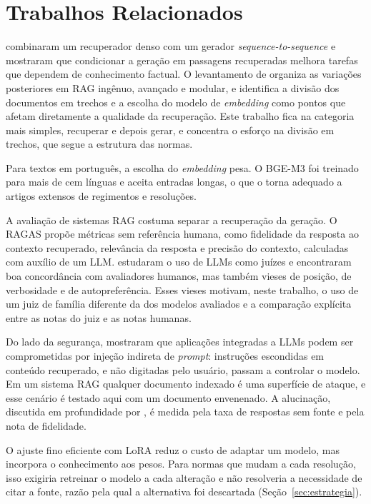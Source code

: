 \chapter{Trabalhos Relacionados}
\label{cap:trabalhos-relacionados}

 combinaram um recuperador denso com um gerador
\textit{sequence-to-sequence} e mostraram que condicionar a geração em passagens
recuperadas melhora tarefas que dependem de conhecimento factual. O levantamento de
 organiza as variações posteriores em RAG ingênuo, avançado e
modular, e identifica a divisão dos documentos em trechos e a escolha do modelo de
\textit{embedding} como pontos que afetam diretamente a qualidade da recuperação. Este
trabalho fica na categoria mais simples, recuperar e depois gerar, e concentra o
esforço na divisão em trechos, que segue a estrutura das normas.

Para textos em português, a escolha do \textit{embedding} pesa. O BGE-M3
\cite{Chen2024} foi treinado para mais de cem línguas e aceita entradas longas, o que o
torna adequado a artigos extensos de regimentos e resoluções.

A avaliação de sistemas RAG costuma separar a recuperação da geração. O RAGAS
\cite{Es2023} propõe métricas sem referência humana, como fidelidade da resposta ao
contexto recuperado, relevância da resposta e precisão do contexto, calculadas com
auxílio de um LLM.  estudaram o uso de LLMs como juízes e
encontraram boa concordância com avaliadores humanos, mas também vieses de posição, de
verbosidade e de autopreferência. Esses vieses motivam, neste trabalho, o uso de um
juiz de família diferente da dos modelos avaliados e a comparação explícita entre as
notas do juiz e as notas humanas.

Do lado da segurança,  mostraram que aplicações integradas a
LLMs podem ser comprometidas por injeção indireta de \textit{prompt}: instruções
escondidas em conteúdo recuperado, e não digitadas pelo usuário, passam a controlar o
modelo. Em um sistema RAG qualquer documento indexado é uma superfície de ataque, e
esse cenário é testado aqui com um documento envenenado. A alucinação, discutida em
profundidade por , é medida pela taxa de respostas sem fonte e pela
nota de fidelidade.

O ajuste fino eficiente com LoRA \cite{Hu2021} reduz o custo de adaptar um modelo,
mas incorpora o conhecimento aos pesos. Para normas que mudam a cada resolução, isso
exigiria retreinar o modelo a cada alteração e não resolveria a necessidade de citar
a fonte, razão pela qual a alternativa foi descartada (Seção~\ref{sec:estrategia}).

